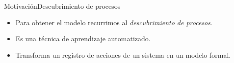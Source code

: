 \documentclass[spanish,pdf]{beamer}
\begin{document}
\begin{frame}{Motivación}{Descubrimiento de procesos}
    \begin{itemize}
      \setlength\itemsep{0.4cm}
      \item<1-> Para obtener el modelo recurrimos al \textit{descubrimiento de procesos}.
      \item<2-> Es una técnica de aprendizaje automatizado.
      \item<3-> Transforma un registro de acciones de un sistema en un modelo formal.
    \end{itemize}
    \vspace*{0.5cm}
    \pause[4]
\end{frame}

\end{document}
